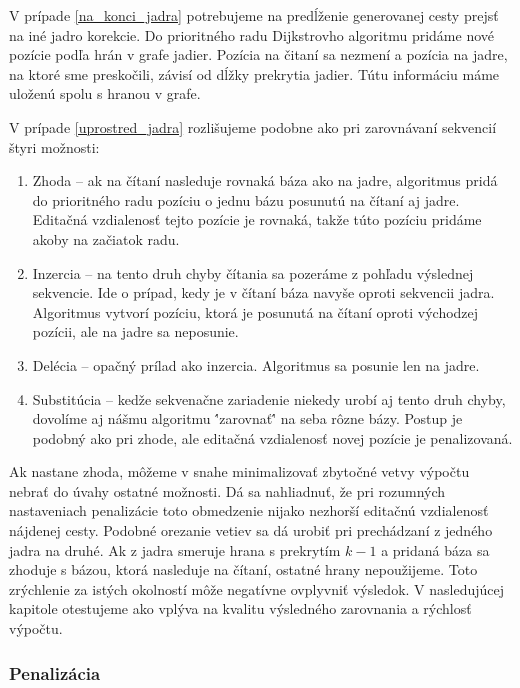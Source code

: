 V prípade \ref{na_konci_jadra} potrebujeme na predĺženie generovanej cesty prejsť na iné jadro korekcie. Do prioritného radu Dijkstrovho algoritmu pridáme nové pozície podľa hrán v grafe jadier. Pozícia na čitaní sa nezmení a pozícia na jadre, na ktoré sme preskočili, závisí od dĺžky prekrytia jadier. Tútu informáciu máme uloženú spolu s hranou v grafe.

V prípade \ref{uprostred_jadra} rozlišujeme podobne ako pri zarovnávaní sekvencií štyri možnosti:

\begin{enumerate}[label={R.\arabic*}]
\item \label{item:zhoda}        Zhoda -- ak na čítaní nasleduje rovnaká báza ako na jadre, algoritmus pridá do prioritného radu pozíciu o jednu bázu posunutú na čítaní aj jadre. Editačná vzdialenosť tejto pozície je rovnaká, takže túto pozíciu pridáme akoby na začiatok radu.
\item \label{item:inzercia}     Inzercia -- na tento druh chyby čítania sa pozeráme z pohľadu výslednej sekvencie. Ide o prípad, kedy je v čítaní báza navyše oproti sekvencii jadra. Algoritmus vytvorí pozíciu, ktorá je posunutá na čítaní oproti východzej pozícii, ale na jadre sa neposunie. 
\item \label{item:delecia}      Delécia -- opačný prílad ako inzercia. Algoritmus sa posunie len na jadre.
\item \label{item:substitucia}  Substitúcia -- kedže sekvenačne zariadenie niekedy urobí aj tento druh chyby, dovolíme aj nášmu algoritmu \''zarovnať\'' na seba rôzne bázy. Postup je podobný ako pri zhode, ale editačná vzdialenosť novej pozície je penalizovaná.
\end{enumerate}

Ak nastane zhoda, môžeme v snahe minimalizovať zbytočné vetvy výpočtu nebrať do úvahy ostatné možnosti. Dá sa nahliadnuť, že pri rozumných nastaveniach penalizácie toto obmedzenie nijako nezhorší editačnú vzdialenosť nájdenej cesty. Podobné orezanie vetiev sa dá urobiť pri prechádzaní z jedného jadra na druhé. Ak z jadra smeruje hrana s prekrytím $k - 1$ a pridaná báza sa zhoduje s bázou, ktorá nasleduje na čítaní, ostatné hrany nepoužijeme. Toto zrýchlenie za istých okolností môže negatívne ovplyvniť výsledok. V nasledujúcej kapitole otestujeme ako vplýva na kvalitu výsledného zarovnania a rýchlosť výpočtu.

\subsubsection{Penalizácia}

